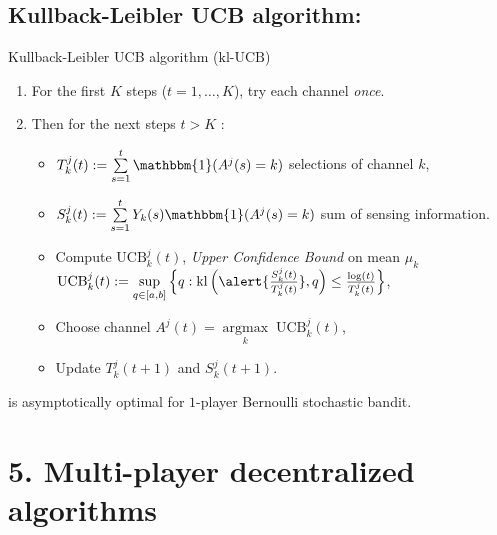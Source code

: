 \documentclass[12pt,english,ignorenonframetext,]{beamer}
\providecommand{\tightlist}{%
  \setlength{\itemsep}{0pt}\setlength{\parskip}{0pt}}
\begin{document}




\subsection{\hfill{}Kullback-Leibler UCB algorithm: \klUCB\hfill{}}

\begin{frame}{Kullback-Leibler UCB algorithm
(\(\mathrm{kl}\)-\(\mathrm{UCB}\))}

\begin{enumerate}
\def\labelenumi{\arabic{enumi}.}
\tightlist
\item
  For the first \(K\) steps (\(t=1,\dots,K\)), try each channel
  \emph{once}.
\item
  Then for the next steps \(t > K\) :

  \begin{itemize}
  \tightlist
  \item
  \(T_k^j(t) := \sum\limits_{s=1}^{t} \mathbbm{1}(A^j(s) = k)\) selections of channel \(k\),
  \item
  \(S_k^j(t) := \sum\limits_{s=1}^{t} Y_{k}(s) \mathbbm{1}(A^j(s) = k)\) sum of sensing information.
  \item
    Compute \(\mathrm{UCB}_k^j(t)\), \emph{Upper Confidence Bound} on mean \(\mu_k\)
    \newline
    \(\mathrm{UCB}_k^j(t) := \sup\limits_{q \in [a, b]} \left\{ q : \mathrm{kl}\left(\alert{\frac{S_k^j(t)}{T_k^j(t)}}, q\right) \leq \frac{\log(t)}{T_k^j(t)} \right\}\),
  \item
    Choose channel \(A^j(t) = \mathop{\arg\max}\limits_{k} \; \mathrm{UCB}_k^j(t)\),
  \item
    Update \(T_k^j(t+1)\) and \(S_k^j(t+1)\).
  \end{itemize}
\end{enumerate}

{\small \klUCB{}
is asymptotically optimal for $1$-player Bernoulli stochastic bandit.
}

\end{frame}



\section{\hfill{}5. Multi-player decentralized algorithms\hfill{}}
\end{document}
